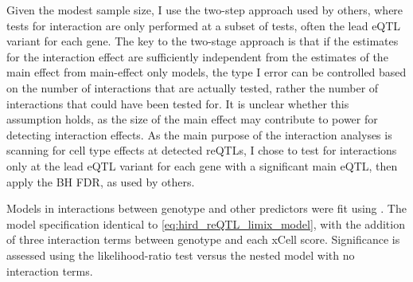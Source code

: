 Given the modest sample size, I use the two-step approach used by others\autocite{westra2015CellSpecificEQTL,peters2016InsightGenotypePhenotypeAssociations,kim-hellmuth2017GeneticRegulatoryEffects,davenport2018DiscoveringVivoCytokineeQTL},
where tests for interaction are only performed at a subset of tests, often the lead \gls{eQTL} variant for each gene.
%
%
%
The key to the two-stage approach is that if the estimates for the interaction effect are sufficiently independent from the estimates of the main effect from main-effect only models,
the type I error can be controlled based on the number of interactions that are actually tested, rather the number of interactions that could have been tested for\autocite{kooperberg2008IncreasingPowerIdentifying,peters2016InsightGenotypePhenotypeAssociations}.
It is unclear whether this assumption holds, as the size of the main effect may contribute to power for detecting interaction effects.
As the main purpose of the interaction analyses is scanning for cell type effects at detected \glspl{reQTL},
I chose to test for interactions only at the lead \gls{eQTL} variant for each gene with a significant main \gls{eQTL},
then apply the \gls{BH} \gls{FDR}, as used by others\autocite{peters2016InsightGenotypePhenotypeAssociations,kim-hellmuth2017GeneticRegulatoryEffects}.

Models in interactions between genotype and other predictors were fit using .
The model specification identical to \cref{eq:hird_reQTL_limix_model}, with the addition of three interaction terms between genotype and each xCell score.
Significance is assessed using the likelihood-ratio test versus the nested model with no interaction terms.

